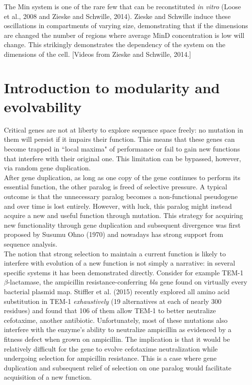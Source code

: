 \documentclass{article}
\begin{document}
The Min system is one of the rare few that can be reconstituted \textit{in vitro} (Loose et al., 2008 and Zieske and Schwille, 2014). Zieske and Schwille induce these oscillations in compartments of varying size, demonstrating that if the dimensions are changed the number of regions where average MinD concentration is low will change. This strikingly demonstrates the dependency of the system on the dimensions of the cell. [Videos from Zieske and Schwille, 2014.]

\section*{Introduction to modularity and evolvability}

Critical genes are not at liberty to explore sequence space freely: no mutation in them will persist if it impairs their function. This means that these genes can become trapped in ``local maxima" of performance or fail to gain new functions that interfere with their original one. This limitation can be bypassed, however, via random gene duplication.\\

After gene duplication, as long as one copy of the gene continues to perform its essential function, the other paralog is freed of selective pressure. A typical outcome is that the unnecessary paralog becomes a non-functional pseudogene and over time is lost entirely. However, with luck, this paralog might instead acquire a new and useful function through mutation. This strategy for acquiring new functionality through gene duplication and subsequent divergence was first proposed by Susumu Ohno (1970) and nowadays has strong support from sequence analysis.\\

The notion that strong selection to maintain a current function is likely to interfere with evolution of a new function is not simply a narrative: in several specific systems it has been demonstrated directly. Consider for example TEM-1 $\beta$-lactamase, the ampicillin resistance-conferring \textit{bla} gene found on virtually every bacterial plasmid map. Stiffler et al. (2015) recently explored all amino acid substitution in TEM-1 \textit{exhaustively} (19 alternatives at each of nearly 300 residues) and found that 106 of them allow TEM-1 to better neutralize cefotaxime, another antibiotic. Unfortunately, most of these mutations also interfere with the enzyme's ability to neutralize ampicillin as evidenced by a fitness defect when grown on ampicillin. The implication is that it would be relatively difficult for the gene to evolve cefotaxime neutralization while undergoing selection for ampicillin resistance. This is a case where gene duplication and subsequent relief of selection on one paralog would facilitate acquisition of a new function. 
\end{document}
